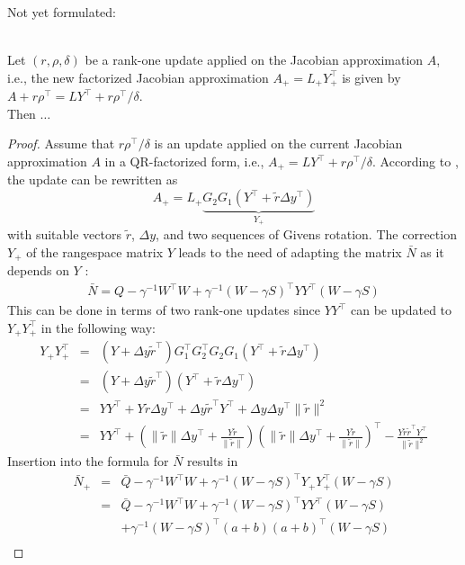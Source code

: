 \documentclass{svmult}
\begin{document}
Not yet formulated:
 \begin{lemma}\\
	Let $(r,\rho,\delta)$ be a rank-one update applied on the Jacobian approximation $A$, i.e., the new factorized Jacobian approximation $A_+=L_+Y_+^{\top}$ 
	is given by $A+r\rho^{\top}=LY^{\top}+r\rho^{\top}/\delta$.\\
	Then $\dots$
\end{lemma}
\begin{proof}
	Assume that $r\rho^{\top}/\delta$ is an update applied on the current Jacobian approximation $A$ in a QR-factorized form, i.e., 
	$A_+=LY^{\top}+r\rho^{\top}/\delta$. According to \cite{tb:MACIEJ}, the update can be rewritten as
	\begin{equation*}
	A_+=L_+\underset{Y_+}{\underbrace{G_2 G_1(Y^{\top}+\tilde{r} \varDelta y^{\top})}}
	\end{equation*}
	with suitable vectors $\tilde{r}$, $ \varDelta y$, and two sequences of Givens rotation.
	The correction $Y_+$ of the rangespace matrix $Y$ leads to the need of adapting the matrix
	$\bar{N}$ as it depends on $Y$ :
\begin{align*}
	\bar{N}= Q - \gamma^{-1} W^\top W +\gamma^{-1}(W -\gamma S )^{\top}YY^{\top}(W - \gamma S )
\end{align*}
	This can be done in terms of two rank-one updates
	since $YY^\top$ can be updated to $Y_+Y_+^\top$ in the following way:
	\begin{eqnarray*}
		Y_+Y_+^\top&=&(Y+\varDelta y\tilde{r}^{\top})G_1^\top G^\top_2 G_2 G_1(Y^{\top}+\tilde{r} \varDelta y^{\top})\\
		&=&(Y+\varDelta y\tilde{r}^{\top})(Y^{\top}+\tilde{r} \varDelta y^{\top}) \\
		&=&YY^{\top} + Y\tilde{r}\varDelta y^{\top} +\varDelta y\tilde{r}^{\top}Y^{\top} +\varDelta y\varDelta y^{\top} \| \tilde{r}\|^2\\
		&=&YY^{\top} + \left(\| \tilde{r}\|\varDelta y^{\top} + \frac{Y\tilde{r}}{\| \tilde{r}\|}\right)\left(\| \tilde{r}\|\varDelta y^{\top} + \frac{Y\tilde{r}}{\| \tilde{r}\|}\right)^\top -\frac{Y\tilde{r}\tilde{r}^\top Y^\top}{\| \tilde{r}\|^2}
	\end{eqnarray*}
	Insertion into the formula for $\bar{N}$ results in
	\begin{eqnarray*}
		\bar{N}_+ &=& \bar{Q}- \gamma^{-1} W^\top W+\gamma^{-1} (W -\gamma S )^{\top}Y_+Y_+^{\top}(W -\gamma S )\\
			&=&\bar{Q}- \gamma^{-1} W^\top W+ \gamma^{-1}(W -\gamma S )^{\top}YY^{\top}(W -\gamma S )\\ &&+\gamma^{-1}(W -\gamma S )^{\top}(a+b)(a+b)^{\top}(W-\gamma S )\\

\end{eqnarray*}
\end{proof}
\end{document}
